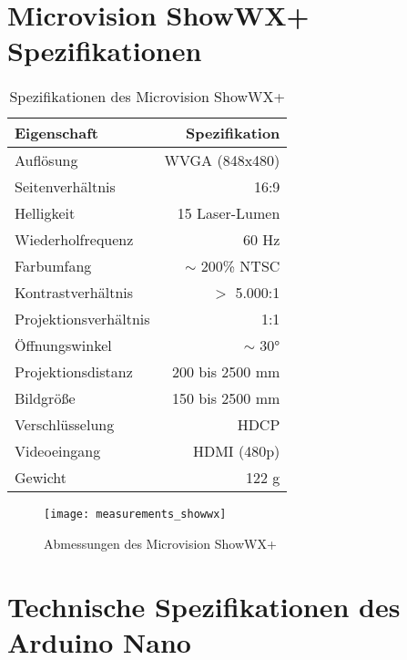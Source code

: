 \section{Microvision ShowWX+ Spezifikationen}
\label{app:projector}
\begin{table}[!ht]
\caption{Spezifikationen des Microvision ShowWX+}
\begin{center}
\vspace{-3mm}
\begin{tabular}{|l|r|}
\hline
\rowcolor{lightgray} Eigenschaft & Spezifikation \\
\hline
Auflösung 	& WVGA (848x480) \\
\hline
Seitenverhältnis & 16:9 \\
\hline
Helligkeit 	& 15 Laser-Lumen \\
\hline
Wiederholfrequenz & 60 Hz \\
\hline
Farbumfang 	& $\sim$ 200\% NTSC \\
\hline
Kontrastverhältnis 	& $>$ 5.000:1 \\
\hline
Projektionsverhältnis 	& 1:1 \\
\hline
Öffnungswinkel & $\sim$ 30°\\
\hline
Projektionsdistanz 	& 200 bis 2500 mm \\
\hline
Bildgröße 	& 150 bis 2500 mm \\
\hline
Verschlüsselung 	& HDCP \\
\hline
Videoeingang & HDMI (480p) \\
\hline
Gewicht 	& 122 g \\
\hline
\end{tabular}
\end{center}
\label{tab:landmarks_f1}
\end{table}

\begin{figure}[hb]
\vspace{-5mm}
\begin{center}
		\texttt{[image: measurements\_showwx]}
\end{center}
\vspace{-5mm}
\caption{Abmessungen des Microvision ShowWX+}
\label{fig.specs_proj}
\end{figure}

\clearpage{}

\section{Technische Spezifikationen des Arduino Nano}
\label{app:arduino}

